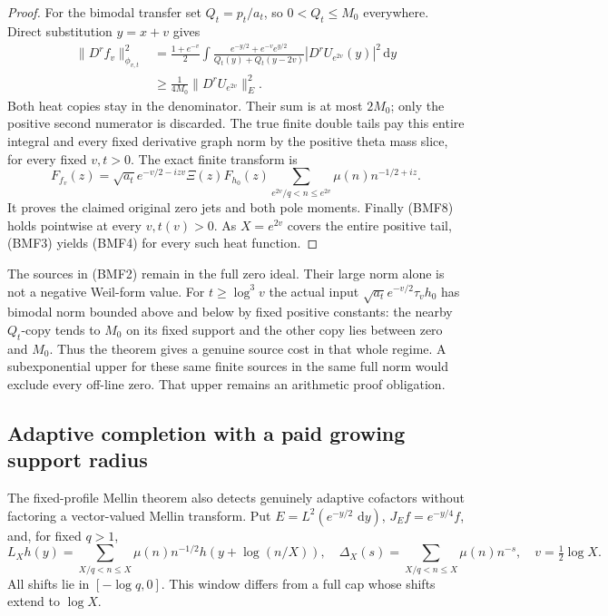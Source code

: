 \documentclass[11pt]{article}
\theoremstyle{remark}\newtheorem{remark}[theorem]{Remark}
\newcommand{\dd}{\,\mathrm d}
\begin{document}
\begin{proof}
For the bimodal transfer set \(Q_t=p_t/a_t\), so
\(0<Q_t\le M_0\) everywhere. Direct substitution \(y=x+v\) gives
\[
 \begin{split}
 \|D^rf_v\|_{\phi_{v,t}}^2
 &=\frac{1+e^{-v}}2
  \int\frac{e^{-y/2}+e^{-v}e^{y/2}}
            {Q_t(y)+Q_t(y-2v)}|D^rU_{e^{2v}}(y)|^2\dd y\\
 &\ge\frac1{4M_0}\|D^rU_{e^{2v}}\|_E^2 .
 \end{split}                                                   \tag{BMF8}
\]
Both heat copies stay in the denominator. Their sum is at most
\(2M_0\); only the positive second numerator is discarded.
The true finite double tails pay this entire integral and every
fixed derivative graph norm by the positive theta mass slice,
for every fixed \(v,t>0\).
The exact finite transform is
\[
 F_{f_v}(z)=\sqrt{a_t}e^{-v/2-izv}\Xi(z)F_{h_0}(z)
                   \sum_{e^{2v}/q<n\le e^{2v}}
                              \mu(n)n^{-1/2+iz}.
\]
It proves the claimed original zero jets and both pole moments.
Finally (BMF8) holds pointwise at every \(v,t(v)>0\).
As \(X=e^{2v}\) covers the entire positive tail,
(BMF3) yields (BMF4) for every such heat function.
\end{proof}

The sources in (BMF2) remain in the full zero ideal.
Their large norm alone is not a negative Weil-form value.
For \(t\ge\log^3v\) the actual input
\(\sqrt{a_t}e^{-v/2}\tau_vh_0\) has bimodal norm bounded
above and below by fixed positive constants: the nearby
\(Q_t\)-copy tends to \(M_0\) on its fixed support and the other
copy lies between zero and \(M_0\).
Thus the theorem gives a genuine source cost in that whole
regime. A subexponential upper for these same finite sources
in the same full norm would exclude every off-line zero.
That upper remains an arithmetic proof obligation.

\subsection{Adaptive completion with a paid growing support radius}
\label{sec:adaptive-completion-radius}

The fixed-profile Mellin theorem also detects genuinely adaptive
cofactors without factoring a vector-valued Mellin transform. Put
\(E=L^2(e^{-y/2}\,\dd y)\), \(J_Ef=e^{-y/4}f\), and, for fixed \(q>1\),
\[
 L_Xh(y)=\sum_{X/q<n\le X}\mu(n)n^{-1/2}h(y+\log(n/X)),
 \quad\Delta_X(s)=\sum_{X/q<n\le X}\mu(n)n^{-s},
 \quad v=\tfrac12\log X.                                  \tag{AC1}
\]
All shifts lie in \([-\log q,0]\). This window differs from a full cap
whose shifts extend to \(\log X\).
\end{document}
